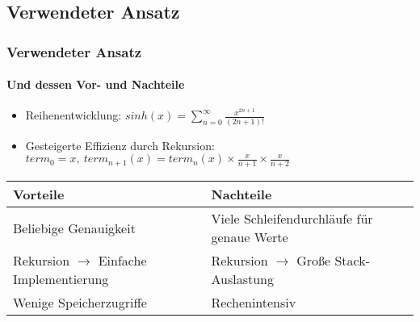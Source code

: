 	\begin{frame}
		\section{Verwendeter Ansatz}
		\frametitle{Verwendeter Ansatz}
		\framesubtitle{Und dessen Vor- und Nachteile}
		
		\begin{itemize}
			\item Reihenentwicklung: \begin{math}sinh(x) = \sum\limits_{n=0}^{\infty} \frac{x^{2n+1}}{(2n+1)!} \end{math}
			\item Gesteigerte Effizienz durch Rekursion: $term_{0} = x, \ term_{n+1}(x) = term_{n}(x) \times \frac{x}{n+1} \times \frac{x}{n+2}$
		\end{itemize}
	\begin{center}
		\begin{tabularx}{\textwidth}{*{2}{|X}|}
			\hline
			\textbf{Vorteile} & \textbf{Nachteile} \\
			\hline 
			\hline
			Beliebige Genauigkeit & Viele Schleifendurchläufe für \newline genaue Werte \\
			\hline
			Rekursion $\rightarrow$ Einfache \newline Implementierung  & Rekursion $\rightarrow$ Große Stack-\newline Auslastung \\
			\hline
			Wenige Speicherzugriffe & Rechenintensiv \\
			\hline
		\end{tabularx}
	\end{center}
	\end{frame}
